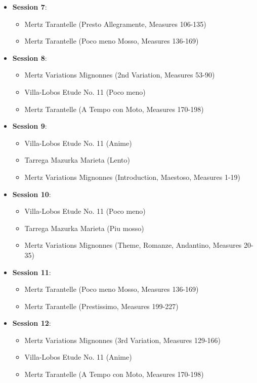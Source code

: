 \documentclass{article}
\begin{document}
\begin{itemize}
\begin{itemize}
            \item Villa-Lobos Etude No. 11 (Poco meno)
            \item Tarrega Mazurka Marieta (Piu mosso)
            \item Mertz Variations Mignonnes (Theme, Romanze, Andantino, Measures 20-35)
        \end{itemize}
    \item \textbf{Session 7}: 
        \begin{itemize}
            \item Mertz Tarantelle (Presto Allegramente, Measures 106-135)
            \item Mertz Tarantelle (Poco meno Mosso, Measures 136-169)
        \end{itemize}
    \item \textbf{Session 8}: 
        \begin{itemize}
            \item Mertz Variations Mignonnes (2nd Variation, Measures 53-90)
            \item Villa-Lobos Etude No. 11 (Poco meno)
            \item Mertz Tarantelle (A Tempo con Moto, Measures 170-198)
        \end{itemize}
    \item \textbf{Session 9}: 
        \begin{itemize}
            \item Villa-Lobos Etude No. 11 (Anime)
            \item Tarrega Mazurka Marieta (Lento)
            \item Mertz Variations Mignonnes (Introduction, Maestoso, Measures 1-19)
        \end{itemize}
    \item \textbf{Session 10}: 
        \begin{itemize}
            \item Villa-Lobos Etude No. 11 (Poco meno)
            \item Tarrega Mazurka Marieta (Piu mosso)
            \item Mertz Variations Mignonnes (Theme, Romanze, Andantino, Measures 20-35)
        \end{itemize}
    \item \textbf{Session 11}: 
        \begin{itemize}
            \item Mertz Tarantelle (Poco meno Mosso, Measures 136-169)
            \item Mertz Tarantelle (Prestissimo, Measures 199-227)
        \end{itemize}
    \item \textbf{Session 12}: 
        \begin{itemize}
            \item Mertz Variations Mignonnes (3rd Variation, Measures 129-166)
            \item Villa-Lobos Etude No. 11 (Anime)
            \item Mertz Tarantelle (A Tempo con Moto, Measures 170-198)
        \end{itemize}
\end{itemize}
\end{document}

